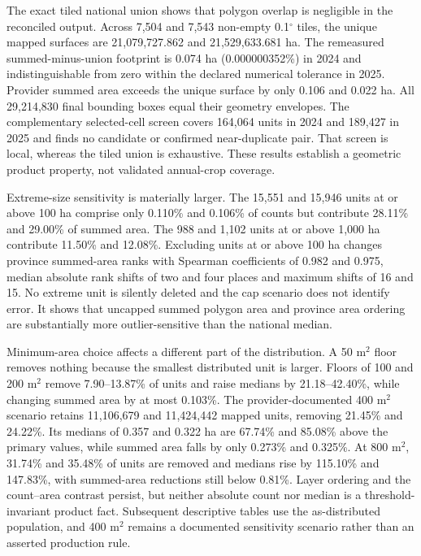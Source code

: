 \documentclass[pdflatex,sn-basic]{sn-jnl}
\begin{document}
The exact tiled national union shows that polygon overlap is negligible in the reconciled output. Across 7,504 and 7,543 non-empty 0.1$^{\circ}$ tiles, the unique mapped surfaces are 21,079,727.862 and 21,529,633.681 ha. The remeasured summed-minus-union footprint is 0.074 ha (0.000000352\%) in 2024 and indistinguishable from zero within the declared numerical tolerance in 2025. Provider summed area exceeds the unique surface by only 0.106 and 0.022 ha. All 29,214,830 final bounding boxes equal their geometry envelopes. The complementary selected-cell screen covers 164,064 units in 2024 and 189,427 in 2025 and finds no candidate or confirmed near-duplicate pair. That screen is local, whereas the tiled union is exhaustive. These results establish a geometric product property, not validated annual-crop coverage.

Extreme-size sensitivity is materially larger. The 15,551 and 15,946 units at or above 100 ha comprise only 0.110\% and 0.106\% of counts but contribute 28.11\% and 29.00\% of summed area. The 988 and 1,102 units at or above 1,000 ha contribute 11.50\% and 12.08\%. Excluding units at or above 100 ha changes province summed-area ranks with Spearman coefficients of 0.982 and 0.975, median absolute rank shifts of two and four places and maximum shifts of 16 and 15. No extreme unit is silently deleted and the cap scenario does not identify error. It shows that uncapped summed polygon area and province area ordering are substantially more outlier-sensitive than the national median.

Minimum-area choice affects a different part of the distribution. A 50 m$^{2}$ floor removes nothing because the smallest distributed unit is larger. Floors of 100 and 200 m$^{2}$ remove 7.90--13.87\% of units and raise medians by 21.18--42.40\%, while changing summed area by at most 0.103\%. The provider-documented 400 m$^{2}$ scenario retains 11,106,679 and 11,424,442 mapped units, removing 21.45\% and 24.22\%. Its medians of 0.357 and 0.322 ha are 67.74\% and 85.08\% above the primary values, while summed area falls by only 0.273\% and 0.325\%. At 800 m$^{2}$, 31.74\% and 35.48\% of units are removed and medians rise by 115.10\% and 147.83\%, with summed-area reductions still below 0.81\%. Layer ordering and the count--area contrast persist, but neither absolute count nor median is a threshold-invariant product fact. Subsequent descriptive tables use the as-distributed population, and 400 m$^{2}$ remains a documented sensitivity scenario rather than an asserted production rule.
\end{document}
